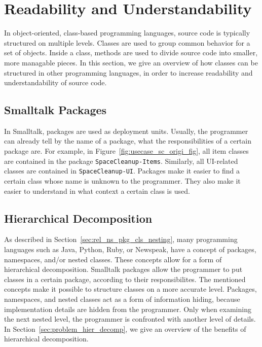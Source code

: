 \section{Readability and Understandability}
In object-oriented, class-based programming languages, source code is typically structured on multiple levels. Classes are used to group common behavior for a set of objects. Inside a class, methods are used to divide source code into smaller, more managable pieces. In this section, we give an overview of how classes can be structured in other programming languages, in order to increase readability and understandability of source code.

\subsection{Smalltalk Packages}
In Smalltalk, packages are used as deployment units. Usually, the programmer can already tell by the name of a package, what the responsibilities of a certain package are. For example, in Figure~\ref{fig:usecase_sc_origi_fig}, all item classes are contained in the package \texttt{SpaceCleanup-Items}. Similarly, all UI-related classes are contained in \texttt{SpaceCleanup-UI}. Packages make it easier to find a certain class whose name is unknown to the programmer. They also make it easier to understand in what context a certain class is used.

\subsection{Hierarchical Decomposition}
As described in Section~\ref{sec:rel_ns_pkg_cls_nesting}, many programming languages such as Java, Python, Ruby, or Newspeak, have a concept of packages, namespaces, and/or nested classes. These concepts allow for a form of hierarchical decomposition. Smalltalk packages allow the programmer to put classes in a certain package, according to their responsibilites. The mentioned concepts make it possible to structure classes on a more accurate level. Packages, namespaces, and nested classes act as a form of information hiding, because implementation details are hidden from the programmer. Only when examining the next nested level, the programmer is confronted with  another level of details. In Section~\ref{sec:problem_hier_decomp}, we give an overview of the benefits of hierarchical decomposition.


